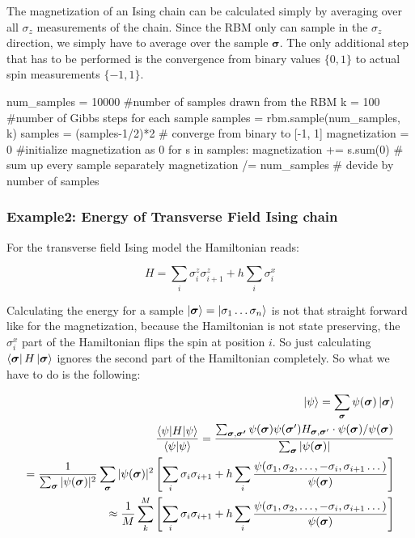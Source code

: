 \documentclass[submission, Phys]{SciPost}
\begin{document}
The magnetization of an Ising chain can be calculated simply by averaging over all $\sigma_z$ measurements of the chain. Since the RBM only can sample in the $\sigma_z$ direction, we simply have to average over the sample $\bm{\sigma}$. The only additional step that has to be performed is the convergence from binary values $\{0,1  \}$ to actual spin measurements $\{-1 ,1  \}$.

\begin{python}
num_samples = 10000 #number of samples drawn from the RBM
k = 100 #number of Gibbs steps for each sample
samples = rbm.sample(num_samples, k)
samples = (samples-1/2)*2 # converge from binary to [-1, 1]
magnetization = 0 #initialize magnetization as 0
for s in samples: 
	magnetization += s.sum(0) # sum up every sample separately
magnetization /= num_samples # devide by number of samples
\end{python}

\subsubsection{Example2: Energy of Transverse Field Ising chain}

For the transverse field Ising model the Hamiltonian reads:

\begin{equation}
H = \sum_i \sigma^z_i \sigma^z_{i+1} + h \sum_i \sigma^x_{i}
\end{equation}

Calculating the energy for a sample $\ket{\bm{\sigma} }= \ket{\sigma_1 \dots  \sigma_n}$ is not that straight forward like for the magnetization, because the Hamiltonian is not state preserving, the $\sigma^x_i$ part of the Hamiltonian flips the spin at position $i$. So just calculating $\bra{\bm{\sigma} } H \ket{\bm{\sigma} }$ ignores the second part of the Hamiltonian completely. So what we have to do is the following:

\begin{align}
\ket{\psi} = \sum_{\bm{\sigma}} \psi(\bm{\sigma}) \ket{\bm{\sigma}} \\
\frac{\braket{\psi | H | \psi}}{\braket{\psi | \psi}} = \frac{\sum_{\bm{\sigma}, \bm{\sigma'}} \psi(\bm{\sigma}) \psi (\bm{\sigma}') H_{\bm{\sigma}, \bm{\sigma}'} \cdot \psi(\bm{\sigma}) / \psi(\bm{\sigma})}{ \sum_{\bm{\sigma}} | \psi(\bm{\sigma})|}  \\
=  \frac{1}{\sum_{\bm{\sigma}} | \psi({\bm{\sigma}} )|^2} \sum_{\bm{\sigma}} | \psi({\bm{\sigma}}) |^2 \left[ \sum_i \sigma_i \sigma_{i+1} + h \sum_i \frac{\psi(\sigma_1, \sigma_2, \dots , -\sigma_i, \sigma_{i+1} \dots)}{\psi (\bm{\sigma})} \right]\\
\approx \frac{1}{M} \sum_k^M \left[ \sum_i \sigma_i \sigma_{i+1} + h \sum_i \frac{\psi(\sigma_1, \sigma_2, \dots , -\sigma_i, \sigma_{i+1} \dots)}{\psi (\bm{\sigma})} \right]
\end{align}
\end{document}
